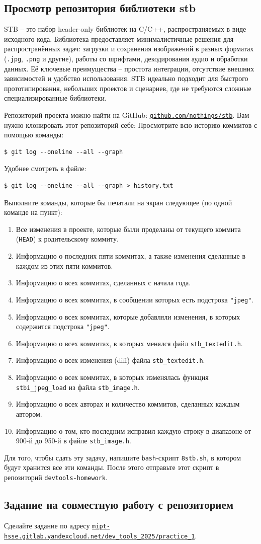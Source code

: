 \documentclass{article}
\begin{document}
\subsection{Просмотр репозитория библиотеки stb}
STB -- это набор header-only библиотек на C/C++, распространяемых в виде исходного кода. Библиотека предоставляет минималистичные решения для распространённых задач: загрузки и сохранения изображений в разных форматах (\texttt{.jpg}, \texttt{.png} и другие), работы со шрифтами, декодирования аудио и обработки данных. Её ключевые преимущества -- простота интеграции, отсутствие внешних зависимостей и удобство использования. STB идеально подходит для быстрого прототипирования, небольших проектов и сценариев, где не требуются сложные специализированные библиотеки.

Репозиторий проекта можно найти на GitHub: \href{https://github.com/nothings/stb}{\texttt{github.com/nothings/stb}}. Вам нужно клонировать этот репозиторий себе:
Просмотрите всю историю коммитов с помощью команды:
\begin{lstlisting}[style=csMiptBash]
$ git log --oneline --all --graph
\end{lstlisting}
Удобнее смотреть в файле:
\begin{lstlisting}[style=csMiptBash]
$ git log --oneline --all --graph > history.txt
\end{lstlisting}
Выполните команды, которые бы печатали на экран следующее (по одной команде на пункт):
\begin{enumerate}
\item Все изменения в проекте, которые были проделаны от текущего коммита (\texttt{HEAD}) к родительскому коммиту.
\item Информацию о последних пяти коммитах, а также изменения сделанные в каждом из этих пяти коммитов.
\item Информацию о всех коммитах, сделанных с начала года.
\item Информацию о всех коммитах, в сообщении которых есть подстрока \texttt{"jpeg"}.
\item Информацию о всех коммитах, которые добавляли изменения, в которых содержится подстрока \texttt{"jpeg"}.
\item Информацию о всех коммитах, в которых менялся файл \texttt{stb\_textedit.h}.
\item Информацию о всех изменения (diff) файла \texttt{stb\_textedit.h}.
\item Информацию о всех коммитах, в которых изменялась функция \texttt{stbi\_jpeg\_load} из файла \texttt{stb\_image.h}.
\item Информацию о всех авторах и количество коммитов, сделанных каждым автором.
\item Информацию о том, кто последним исправил каждую строку в диапазоне от 900-й до 950-й в файле \texttt{stb\_image.h}.
\end{enumerate}
\noindent Для того, чтобы сдать эту задачу, напишите \texttt{bash}-скрипт \texttt{8stb.sh}, в котором будут хранится все эти команды. После этого отправьте этот скрипт в репозиторий \texttt{devtools-homework}.


\subsection{Задание на совместную работу с репозиторием}
Сделайте задание по адресу  \texttt{\href{https://mipt-hsse.gitlab.yandexcloud.net/dev_tools_2025/practice_1}{mipt-hsse.gitlab.yandexcloud.net/dev\_tools\_2025/practice\_1}}.
\end{document}
